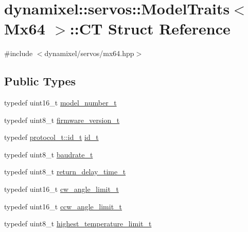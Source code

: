 \hypertarget{structdynamixel_1_1servos_1_1_model_traits_3_01_mx64_01_4_1_1_c_t}{}\section{dynamixel\+:\+:servos\+:\+:Model\+Traits$<$ Mx64 $>$\+:\+:C\+T Struct Reference}
\label{structdynamixel_1_1servos_1_1_model_traits_3_01_mx64_01_4_1_1_c_t}


{\ttfamily \#include $<$dynamixel/servos/mx64.\+hpp$>$}

\subsection*{Public Types}
\begin{DoxyCompactItemize}
\item 
typedef uint16\+\_\+t \hyperlink{structdynamixel_1_1servos_1_1_model_traits_3_01_mx64_01_4_1_1_c_t_a3fd21474b292dda4b09bc9269bffadee}{model\+\_\+number\+\_\+t}
\item 
typedef uint8\+\_\+t \hyperlink{structdynamixel_1_1servos_1_1_model_traits_3_01_mx64_01_4_1_1_c_t_aed4ec64dd0f27c3e32eea08d6d1decd5}{firmware\+\_\+version\+\_\+t}
\item 
typedef \hyperlink{classdynamixel_1_1protocols_1_1_protocol1_a1d4dfa22b01f80b1876d14f539d52b5c}{protocol\+\_\+t\+::id\+\_\+t} \hyperlink{structdynamixel_1_1servos_1_1_model_traits_3_01_mx64_01_4_1_1_c_t_a3d963c11cb823e4dc024e7c18bb80e23}{id\+\_\+t}
\item 
typedef uint8\+\_\+t \hyperlink{structdynamixel_1_1servos_1_1_model_traits_3_01_mx64_01_4_1_1_c_t_ab3888d542c00250138ef5a328d77a978}{baudrate\+\_\+t}
\item 
typedef uint8\+\_\+t \hyperlink{structdynamixel_1_1servos_1_1_model_traits_3_01_mx64_01_4_1_1_c_t_ad342eadcece3ecf4f47d345b80f2b88c}{return\+\_\+delay\+\_\+time\+\_\+t}
\item 
typedef uint16\+\_\+t \hyperlink{structdynamixel_1_1servos_1_1_model_traits_3_01_mx64_01_4_1_1_c_t_a2f3de52f0d1e474494254fa8654ef9f2}{cw\+\_\+angle\+\_\+limit\+\_\+t}
\item 
typedef uint16\+\_\+t \hyperlink{structdynamixel_1_1servos_1_1_model_traits_3_01_mx64_01_4_1_1_c_t_adc386da9764cc01eefa9a2f0c7d7551e}{ccw\+\_\+angle\+\_\+limit\+\_\+t}
\item 
typedef uint8\+\_\+t \hyperlink{structdynamixel_1_1servos_1_1_model_traits_3_01_mx64_01_4_1_1_c_t_a48246cdb32980742a52e2e5f6dec65f2}{highest\+\_\+temperature\+\_\+limit\+\_\+t}

\end{DoxyCompactItemize}
